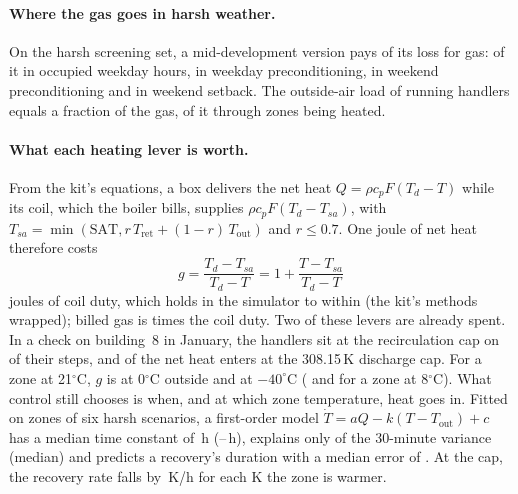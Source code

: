 \documentclass{article}
\begin{document}
\paragraph{Where the gas goes in harsh weather.} On the harsh screening set, a mid-development version pays \RSixDecGas{} of its loss for gas: \RSixDecOccWd{} of it in occupied weekday hours, \RSixDecPreWd{} in weekday preconditioning, \RSixDecPreWe{} in weekend preconditioning and \RSixDecSbWe{} in weekend setback. The outside-air load of running handlers equals a fraction \RSixDecVent{} of the gas, \RSixDecVentHeated{} of it through zones being heated.

\paragraph{What each heating lever is worth.}
From the kit's equations, a box delivers the net heat $Q=\rho c_p F (T_d - T)$ while its coil, which the boiler bills, supplies $\rho c_p F (T_d - T_{sa})$, with $T_{sa}=\min(\text{SAT}, r\,T_{\text{ret}} + (1-r)\,T_{\text{out}})$ and $r\le 0.7$. One joule of net heat therefore costs
\begin{equation}
g = \frac{T_d - T_{sa}}{T_d - T} = 1 + \frac{T - T_{sa}}{T_d - T}
\label{eq:g}
\end{equation}
joules of coil duty, which holds in the simulator to within \RSevGErr{} (the kit's methods wrapped); billed gas is \RSevGasOverCoil{} times the coil duty.
Two of these levers are already spent. In a check on building~8 in January, the handlers sit at the recirculation cap on \RSevRecircCapShare{} of their steps, and \RSevCapHeatShare{} of the net heat enters at the 308.15\,K discharge cap. For a zone at 21$^\circ$C, $g$ is \RSevGZero{} at 0$^\circ$C outside and \RSevGMinusForty{} at $-40^\circ$C (\RSevGColdZero{} and \RSevGColdMinusForty{} for a zone at 8$^\circ$C). What control still chooses is when, and at which zone temperature, heat goes in. Fitted on \RSevNZones{} zones of six harsh scenarios, a first-order model $\dot T = aQ - k(T - T_{\text{out}}) + c$ has a median time constant of \RSevTauMed\,h (\RSevTauLo--\RSevTauHi\,h), explains only \RSevRTwo{} of the 30-minute variance (median) and predicts a recovery's duration with a median error of \RSevRecErr. At the cap, the recovery rate falls by \RSevRateSlope\,K/h for each K the zone is warmer.
\end{document}
